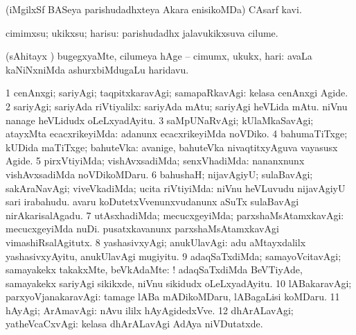 \noindent 
\gl{\pagu}
\expl{}
\bmng
{} (iMgilxSf BASeya parishudadhxteya Akara enisikoMDa) CAsarf kavi. 
\emng
\eentry

\bentry
{} 
\gl{\sakirx}
\expl{}
\bmng
cimimxsu; ukikxsu; harisu:  parishudadhx jalavukikxsuva cilume. 
\emng

\noindent 
\gl{\akirx}
\expl{}
\bmng
(sAhitayx \parx) bugegxyaMte, cilumeya hAge -- cimumx, ukukx, hari:  avaLa kaNiNxniMda ashurxbiMdugaLu haridavu. 
\emng
\eentry

\bentry
{} 
\gl{\kirxvi}
\bmng
\bnum
\num{1} cenAnxgi; sariyAgi; taqpitxkaravAgi; samapaRkavAgi:  kelasa cenAnxgi Agide. 
\num{2} sariyAgi; sariyAda riVtiyalilx:  sariyAda mAtu; sariyAgi heVLida mAtu.  niVnu nanage heVLidudx oLeLxyadAyitu. 
\num{3} saMpUNaRvAgi; kUlaMkaSavAgi; atayxMta ecacxrikeyiMda:  adanunx ecacxrikeyiMda noVDiko. 
\num{4} bahumaTiTxge; kUDida maTiTxge; bahuteVka:  avanige, bahuteVka nivaqtitxyAguva vayasusx Agide. 
\num{5} pirxVtiyiMda; vishAvxsadiMda; senxVhadiMda:  nananxnunx vishAvxsadiMda noVDikoMDaru. 
\num{6} bahushaH; nijavAgiyU; sulaBavAgi; sakAraNavAgi; viveVkadiMda; ucita riVtiyiMda:  niVnu heVLuvudu nijavAgiyU sari irabahudu.  avaru koDutetxVvenunxvudanunx aSuTx sulaBavAgi nirAkarisalAgadu. 
\num{7} utAsxhadiMda; mecucxgeyiMda; parxshaMsAtamxkavAgi:  mecucxgeyiMda nuDi.  pusatxkavanunx parxshaMsAtamxkavAgi vimashiRsalAgitutx. 
\num{8} yashasivxyAgi; anukUlavAgi:  adu aMtayxdalilx yashasivxyAyitu, anukUlavAgi mugiyitu. 
\num{9} adaqSaTxdiMda; samayoVcitavAgi; samayakekx takakxMte, beVkAdaMte: ! adaqSaTxdiMda BeVTiyAde, samayakekx sariyAgi sikikxde, niVnu sikidudx oLeLxyadAyitu. 
\num{10} lABakaravAgi; parxyoVjanakaravAgi:  tamage lABa mADikoMDaru, lABagaLisi koMDaru. 
\num{11} hAyAgi; ArAmavAgi:  nAvu ililx hAyAgidedxVve. 
\num{12} dhArALavAgi; yatheVcaCxvAgi:  kelasa dhArALavAgi AdAya niVDutatxde. 
\enum
\emng

